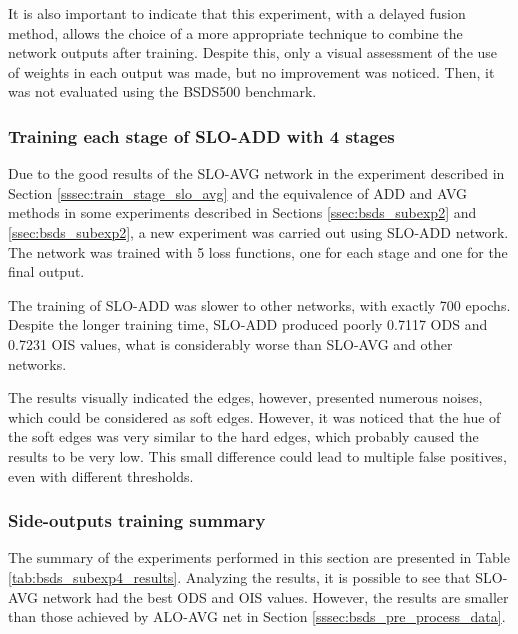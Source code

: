 It is also important to indicate that this experiment, with a delayed fusion method, allows the choice of a more appropriate technique to combine the network outputs after training.
Despite this, only a visual assessment of the use of weights in each output was made, but no improvement was noticed. 
Then, it was not evaluated using the BSDS500 benchmark.

\subsubsection{Training each stage of SLO-ADD  with 4 stages}
\label{sssec:train_stage_slo_add}

Due to the good results of the SLO-AVG network in the experiment described in Section \ref{sssec:train_stage_slo_avg} and the equivalence of ADD and AVG methods in some experiments described in Sections \ref{ssec:bsds_subexp2} and \ref{ssec:bsds_subexp2}, a new experiment was carried out using SLO-ADD network.
The network was trained with 5 loss functions, one for each stage and one for the final output.

The training of SLO-ADD was slower to other networks, with exactly 700 epochs.
Despite the longer training time, SLO-ADD produced poorly 0.7117 ODS and 0.7231 OIS values, what is considerably worse than SLO-AVG and other networks.

The results visually indicated the edges, however, presented numerous noises, which could be considered as soft edges.
However, it was noticed that the hue of the soft edges was very similar to the hard edges, which probably caused the results to be very low.
This small difference could lead to multiple false positives, even with different thresholds.

\subsubsection{Side-outputs training summary}
\label{sssec:sideout_train_summary}

The summary of the experiments performed in this section are presented in Table \ref{tab:bsds_subexp4_results}.
Analyzing the results, it is possible to see that SLO-AVG network had the best ODS and OIS values.
However, the results are smaller than those achieved by ALO-AVG net in Section \ref{sssec:bsds_pre_process_data}.

